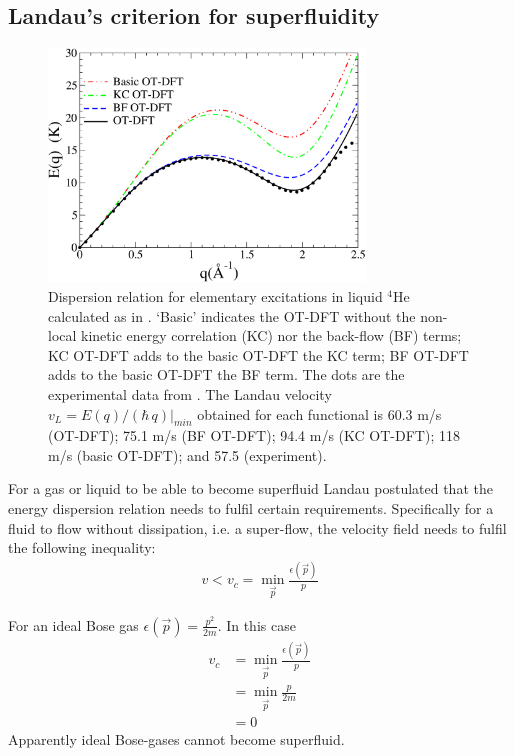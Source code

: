 		\subsection{Landau's criterion for superfluidity}
			\begin{figure}[t]
				\begin{center}
					\includegraphics[width=0.75\textwidth]{dispersion-relation}
					\caption{Dispersion relation for elementary excitations in liquid $^4$He calculated as in  \cite{Mat10a}. `Basic' indicates the OT-DFT without the non-local kinetic energy correlation (KC) nor the back-flow (BF) terms; KC OT-DFT adds  to the basic OT-DFT the KC term; BF OT-DFT adds to the basic OT-DFT the BF term. The dots are the experimental data from \cite{Don81}. The Landau velocity $v_L = E(q)/(\hbar\,q)|_{min}$ obtained for each functional is  60.3 m/s (OT-DFT); 75.1 m/s (BF OT-DFT); 94.4 m/s (KC OT-DFT); 118 m/s (basic OT-DFT); and 57.5 (experiment).}
					\label{fig:dispersion-relation}
				\end{center}
			\end{figure}
		
			For a gas or liquid to be able to become superfluid Landau postulated that the energy dispersion relation needs to fulfil certain requirements. Specifically for a fluid to flow  without dissipation, i.e. a super-flow, the velocity field needs to fulfil the following inequality:
			\begin{align}
				v<v_c = \min_{\vec{p}}\frac{\epsilon(\vec{p})}{p}
			\end{align}
			
			For an ideal Bose gas $\epsilon(\vec{p})= \frac{p^2}{2m}$. In this case 
			\begin{align}
				v_c &= \min_{\vec{p}}\frac{\epsilon(\vec{p})}{p} \\
					&= \min_{\vec{p}}\frac{p}{2m} \\
					&= 0
			\end{align}
			Apparently ideal Bose-gases cannot become superfluid.\\
			
